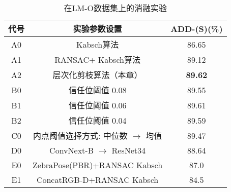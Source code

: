\begin{table}[htbp]
  \centering
  \caption{在LM-O数据集上的消融实验}
  \label{tab:hipose_ablation_study}
  \begin{tabular}{@{}c|c|c@{}}
    \toprule
    代号 & 实验参数设置 & ADD-(S)(\%) \\
     \midrule
     A0 &Kabsch算法& 86.65 \\
     A1 &RANSAC+ Kabsch算法& 89.12 \\
     A2 &层次化剪枝算法（本章） &\textbf{89.62}\\
     \midrule
     B0 &信任位阈值 0.08& 89.55 \\
     B1 &信任位阈值 0.06& 89.61 \\
     B2 &信任位阈值 0.04& 89.59 \\
     \midrule
     C0 &内点阈值选择方式: 中位数 $\rightarrow$ 均值 & 89.47 \\
     \midrule
     D0 & ConvNext-B\cite{Liu2022ACF} $\rightarrow$ ResNet34\cite{he2016resnet} & 88.64 \\
     \midrule
     E0 & ZebraPose(PBR)+RANSAC Kabsch&87.0\\
     E1 & ConcatRGB-D+RANSAC Kabsch&84.5\\
    \bottomrule
  \end{tabular}
\end{table}